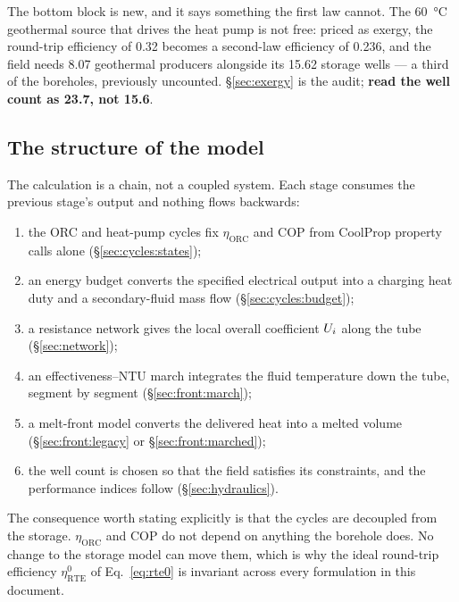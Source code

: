 The bottom block is new, and it says something the first law cannot. The
\SI{60}{\celsius} geothermal source that drives the heat pump is not free:
priced as exergy, the round-trip efficiency of \num{0.32} becomes a
second-law efficiency of \num{0.236}, and the field needs \num{8.07}
geothermal producers alongside its \num{15.62} storage wells --- a third of
the boreholes, previously uncounted. \S\ref{sec:exergy} is the audit;
\textbf{read the well count as \num{23.7}, not \num{15.6}}.

\subsection{The structure of the model}

The calculation is a chain, not a coupled system. Each stage consumes the
previous stage's output and nothing flows backwards:

\begin{enumerate}[itemsep=1pt]
\item the ORC and heat-pump cycles fix $\eta_{\mathrm{ORC}}$ and
      $\mathrm{COP}$ from CoolProp property calls alone
      (\S\ref{sec:cycles:states});
\item an energy budget converts the specified electrical output into a charging
      heat duty and a secondary-fluid mass flow (\S\ref{sec:cycles:budget});
\item a resistance network gives the local overall coefficient $U_{i}$ along the
      tube (\S\ref{sec:network});
\item an effectiveness--NTU march integrates the fluid temperature down the
      tube, segment by segment (\S\ref{sec:front:march});
\item a melt-front model converts the delivered heat into a melted volume
      (\S\ref{sec:front:legacy} or \S\ref{sec:front:marched});
\item the well count is chosen so that the field satisfies its constraints, and
      the performance indices follow (\S\ref{sec:hydraulics}).
\end{enumerate}

The consequence worth stating explicitly is that the cycles are decoupled from
the storage. $\eta_{\mathrm{ORC}}$ and $\mathrm{COP}$ do not depend on anything
the borehole does. No change to the storage model can move them, which is why
the ideal round-trip efficiency $\eta_{\mathrm{RTE}}^{0}$ of
Eq.~\eqref{eq:rte0} is invariant across every formulation in this document.

